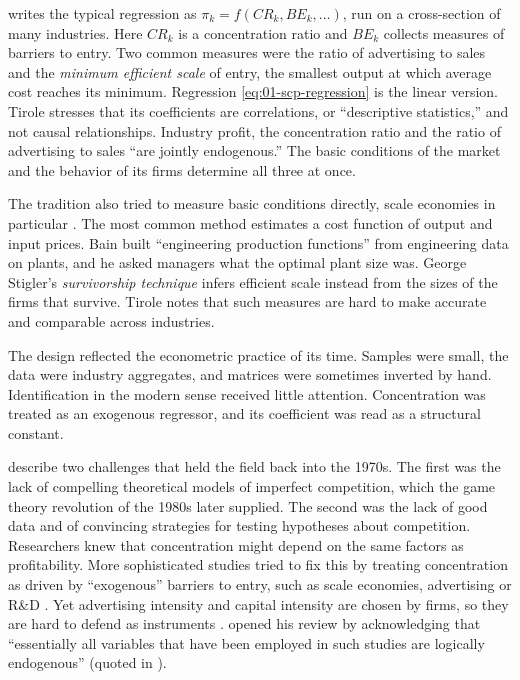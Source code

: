 \citet[Introduction]{Tirole1988} writes the typical regression as $\pi_k = f(\mathit{CR}_k, \mathit{BE}_k, \dots)$,
run on a cross-section of many industries. Here $\mathit{CR}_k$ is a concentration ratio and $\mathit{BE}_k$
collects measures of barriers to entry. Two common measures were the ratio of advertising to sales and the
\emph{minimum efficient scale} of entry, the smallest output at which average cost reaches its minimum.
Regression \eqref{eq:01-scp-regression} is the linear version. Tirole stresses that its coefficients are
correlations, or ``descriptive statistics,'' and not causal relationships. Industry profit, the concentration
ratio and the ratio of advertising to sales ``are jointly endogenous.'' The basic conditions of the market and
the behavior of its firms determine all three at once.

The tradition also tried to measure basic conditions directly, scale economies in particular
\citep[Introduction, note~4]{Tirole1988}. The most common method estimates a cost function of output and input
prices. Bain built ``engineering production functions'' from engineering data on plants, and he asked managers
what the optimal plant size was. George Stigler's \emph{survivorship technique} infers efficient scale instead
from the sizes of the firms that survive. Tirole notes that such measures are hard to make accurate and
comparable across industries.

The design reflected the econometric practice of its time. Samples were small, the data were industry
aggregates, and matrices were sometimes inverted by hand. Identification in the modern sense received
little attention. Concentration was treated as an exogenous regressor, and its coefficient was read as a
structural constant.

\citet[p.~146]{EinavLevin2010} describe two challenges that held the field back into the 1970s. The
first was the lack of compelling theoretical models of imperfect competition, which the game theory
revolution of the 1980s later supplied. The second was the lack of good data and of convincing
strategies for testing hypotheses about competition. Researchers knew that concentration might depend on
the same factors as profitability. More sophisticated studies tried to fix this by treating concentration
as driven by ``exogenous'' barriers to entry, such as scale economies, advertising or R\&D
\citep[p.~146]{EinavLevin2010}. Yet advertising intensity and capital intensity are chosen by firms, so
they are hard to defend as instruments \citep[p.~147]{EinavLevin2010}. \citet[p.~954]{Schmalensee1989}
opened his review by acknowledging that ``essentially all variables that have been employed in such
studies are logically endogenous'' (quoted in \citealp[p.~147]{EinavLevin2010}).

